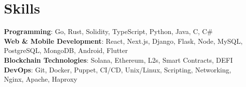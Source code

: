 
\section{Skills}

\begin{itemize}[leftmargin=0.15in, label={}]

\small{\item{\textbf{Programming}{: Go, Rust, Solidity, TypeScript, Python, Java, C, C\# } \\

\textbf{Web \& Mobile Development}{: React, Next.js, Django, Flask, Node, MySQL, PostgreSQL, MongoDB, Android, Flutter} \\

\textbf{Blockchain Technologies}{: Solana, Ethereum, L2s, Smart Contracts, DEFI} \\

\textbf{DevOps}{: Git, Docker, Puppet, CI/CD, Unix/Linux, Scripting, Networking, Nginx, Apache, Haproxy} \\
}}

\end{itemize}
